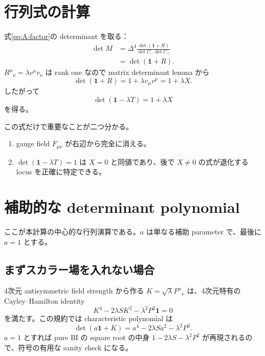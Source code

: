 \documentclass[a4paper,11pt]{ltjsreport}
\newcommand{\Id}{\mathbf 1}
\begin{document}
\section{行列式の計算}

式\eqref{eq:A-factor}の determinant を取る：
\begin{align}
 \det M
 &=\Delta^4
 \frac{\det(\Id+R)}{\det C_-\det C_+}\\
 &=\det(\Id+R).
\end{align}
$R^\mu{}_{\nu}=\lambda v^\mu v_\nu$ は rank one なので matrix determinant lemma から
\begin{equation}
 \det(\Id+R)=1+\lambda v_\mu v^\mu=1+\lambda X.
\end{equation}
したがって
\begin{equation}
 \det(\Id-\lambda T)=1+\lambda X
 \label{eq:detA-X}
\end{equation}
を得る。

この式だけで重要なことが二つ分かる。
\begin{enumerate}[label=(\arabic*)]
 \item gauge field $F_{\mu\nu}$ が右辺から完全に消える。
 \item $\det(\Id-\lambda T)=1$ は $X=0$ と同値であり、後で $X\neq0$ の式が退化する locus を正確に特定できる。
\end{enumerate}

\section{補助的な determinant polynomial}

ここが本計算の中心的な行列演算である。$a$ は単なる補助 parameter で、最後に $a=1$ とする。

\subsection{まずスカラー場を入れない場合}

4次元 antisymmetric field strength から作る $K=\sqrt\lambda F^\mu{}_{\nu}$ は、4次元特有の Cayley--Hamilton identity
\begin{equation}
 K^4-2\lambda S K^2-\lambda^2P^2\Id=0
 \label{eq:K-CH}
\end{equation}
を満たす。この規約では characteristic polynomial は
\begin{equation}
 \det(a\Id+K)
 =a^4-2\lambda S a^2-\lambda^2P^2.
 \label{eq:det-aK}
\end{equation}
$a=1$ とすれば pure BI の square root の中身 $1-2\lambda S-\lambda^2P^2$ が再現されるので、符号の有用な sanity check になる。
\end{document}
